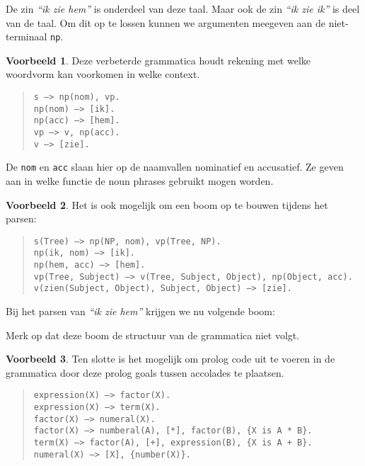 \documentclass[]{article}
\theoremstyle{definition}
\newtheorem{ex}{Voorbeeld}[section]
\newcommand{\example}[1]{\textit{``#1''}}
\begin{document}
De zin \example{ik zie hem} is onderdeel van deze taal. Maar ook de zin \example{ik zie ik} is deel van de taal. Om dit op te lossen kunnen we argumenten meegeven aan de niet-terminaal \texttt{np}.

\begin{ex}
  \label{ex:nom-acc-features}
  Deze verbeterde grammatica houdt rekening met welke woordvorm kan voorkomen in welke context.
  \begin{quote}
    \texttt{s ---> np(nom), vp.} \\
    \texttt{np(nom) ---> [ik].} \\
    \texttt{np(acc) ---> [hem].} \\
    \texttt{vp ---> v, np(acc).} \\
    \texttt{v ---> [zie].} \\
  \end{quote}
\end{ex} 

De \texttt{nom} en \texttt{acc} slaan hier op de naamvallen nominatief en accusatief. Ze geven aan in welke functie de noun phrases gebruikt mogen worden.

\begin{ex} Het is ook mogelijk om een boom op te bouwen tijdens het parsen:
  \begin{quote}
    \texttt{s(Tree) ---> np(NP, nom), vp(Tree, NP).} \\
    \texttt{np(ik, nom) ---> [ik].} \\
    \texttt{np(hem, acc) ---> [hem].} \\
    \texttt{vp(Tree, Subject) ---> v(Tree, Subject, Object), np(Object, acc).} \\
    \texttt{v(zien(Subject, Object), Subject, Object) ---> [zie].}
  \end{quote}
\end{ex} 

Bij het parsen van \example{ik zie hem} krijgen we nu volgende boom:


Merk op dat deze boom de structuur van de grammatica niet volgt.

\begin{ex} Ten slotte is het mogelijk om prolog code uit te voeren in de grammatica door deze prolog goals tussen accolades te plaatsen.
  \begin{quote}
    \texttt{expression(X) ---> factor(X).} \\
    \texttt{expression(X) ---> term(X).} \\

    \texttt{factor(X) ---> numeral(X).} \\
    \texttt{factor(X) ---> numberal(A), [*], factor(B), \{X is A * B\}.} \\
    \texttt{term(X) ---> factor(A), [+], expression(B), \{X is A + B\}.} \\

    \texttt{numeral(X) ---> [X], \{number(X)\}.} \\
  \end{quote}
\end{ex} 
\end{document}
